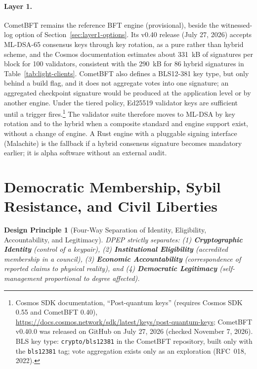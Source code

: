 \documentclass[10pt,twoside,openany]{book}
\theoremstyle{dpepstyle}
\newtheorem{designrule}{Design Principle}[chapter]
\begin{document}
\paragraph{Layer 1.}
CometBFT remains the reference BFT engine (provisional), beside the witnessed-log option of Section~\ref{sec:layer1-options}. Its v0.40 release (July 27, 2026) accepts ML-DSA-65 consensus keys through key rotation, as a pure rather than hybrid scheme, and the Cosmos documentation estimates about 331~kB of signatures per block for 100 validators, consistent with the 290~kB for 86 hybrid signatures in Table~\ref{tab:light-clients}. CometBFT also defines a BLS12-381 key type, but only behind a build flag, and it does not aggregate votes into one signature; an aggregated checkpoint signature would be produced at the application level or by another engine. Under the tiered policy, Ed25519 validator keys are sufficient until a trigger fires.\footnote{Cosmos SDK documentation, ``Post-quantum keys'' (requires Cosmos SDK 0.55 and CometBFT 0.40), \url{https://docs.cosmos.network/sdk/latest/keys/post-quantum-keys}; CometBFT v0.40.0 was released on GitHub on July 27, 2026 (checked November 7, 2026). BLS key type: \texttt{crypto/bls12381} in the CometBFT repository, built only with the \texttt{bls12381} tag; vote aggregation exists only as an exploration (RFC~018, 2022).} The validator suite therefore moves to ML-DSA by key rotation and to the hybrid when a composite standard and engine support exist, without a change of engine. A Rust engine with a pluggable signing interface (Malachite) is the fallback if a hybrid consensus signature becomes mandatory earlier; it is alpha software without an external audit.

\section{Democratic Membership, Sybil Resistance, and Civil Liberties}
\label{sec:membership}

\begin{designrule}[Four-Way Separation of Identity, Eligibility, Accountability, and Legitimacy]
DPEP strictly separates: (1) \textbf{Cryptographic Identity} (control of a keypair), (2) \textbf{Institutional Eligibility} (accredited membership in a council), (3) \textbf{Economic Accountability} (correspondence of reported claims to physical reality), and (4) \textbf{Democratic Legitimacy} (self-management proportional to degree affected).
\end{designrule}
\end{document}
